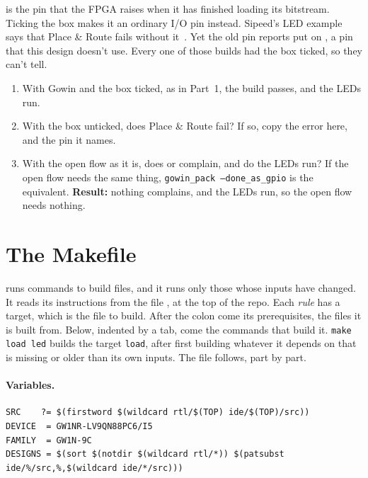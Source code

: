 \documentclass[11pt,a4paper]{article}
\begin{document}
 is the pin that the FPGA raises when it has finished loading its bitstream. Ticking the box makes it an ordinary I/O pin instead. Sipeed’s LED example says that Place \& Route fails without it~\cite{sipeedled}. Yet the old pin reports put  on , a pin that this design doesn’t use. Every one of those builds had the box ticked, so they can’t tell.

\begin{enumerate}
  \item With Gowin and the box ticked, as in Part~1, the build passes, and the LEDs run.
  \item With the box unticked, does Place \& Route fail? If so, copy the error here, and the pin it names.
  \item With the open flow as it is, does  or  complain, and do the LEDs run? If the open flow needs the same thing, \texttt{gowin\_pack --done\_as\_gpio} is the equivalent. \textbf{Result:} nothing complains, and the LEDs run, so the open flow needs nothing.
\end{enumerate}

\section{The Makefile}\label{app:make}

 runs commands to build files, and it runs only those whose inputs have changed. It reads its instructions from the file , at the top of the repo. Each \emph{rule} has a target, which is the file to build. After the colon come its prerequisites, the files it is built from. Below, indented by a tab, come the commands that build it. \texttt{make load led} builds the target \texttt{load}, after first building whatever it depends on that is missing or older than its own inputs. The file follows, part by part.

\paragraph{Variables.}

\begin{verbatim}
SRC    ?= $(firstword $(wildcard rtl/$(TOP) ide/$(TOP)/src))
DEVICE  = GW1NR-LV9QN88PC6/I5
FAMILY  = GW1N-9C
DESIGNS = $(sort $(notdir $(wildcard rtl/*)) $(patsubst ide/%/src,%,$(wildcard ide/*/src)))
\end{verbatim}
\end{document}
